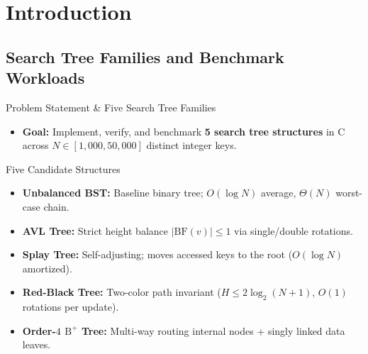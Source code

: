 \documentclass[aspectratio=169, 10pt, xcolor={x11names}]{beamer}
\newcommand{\bfactor}[1]{\ensuremath{\mathrm{BF}(#1)}}
\begin{document}
\section{Introduction}

\subsection{Search Tree Families and Benchmark Workloads}
\begin{frame}{Problem Statement \& Five Search Tree Families}
\begin{itemize}\setlength{\itemsep}{0.4em}
  \item \textbf{Goal:} Implement, verify, and benchmark \textbf{5 search tree structures} in C across $N \in [1{,}000, 50{,}000]$ distinct integer keys.
\end{itemize}

\vspace{0.3em}
\begin{block}{Five Candidate Structures}
\begin{itemize}\setlength{\itemsep}{0.45em}
  \item \textbf{\color{primary}Unbalanced BST:} Baseline binary tree; $O(\log N)$ average, $\Theta(N)$ worst-case chain.
  \item \textbf{\color{primary}AVL Tree:} Strict height balance $|\bfactor{v}| \le 1$ via single/double rotations.
  \item \textbf{\color{primary}Splay Tree:} Self-adjusting; moves accessed keys to the root ($O(\log N)$ amortized).
  \item \textbf{\color{primary}Red-Black Tree:} Two-color path invariant ($H \le 2\log_2(N+1)$, $O(1)$ rotations per update).
  \item \textbf{\color{primary}Order-$4$ $\text{B}^+$ Tree:} Multi-way routing internal nodes + singly linked data leaves.
\end{itemize}
\end{block}
\end{frame}
\end{document}
